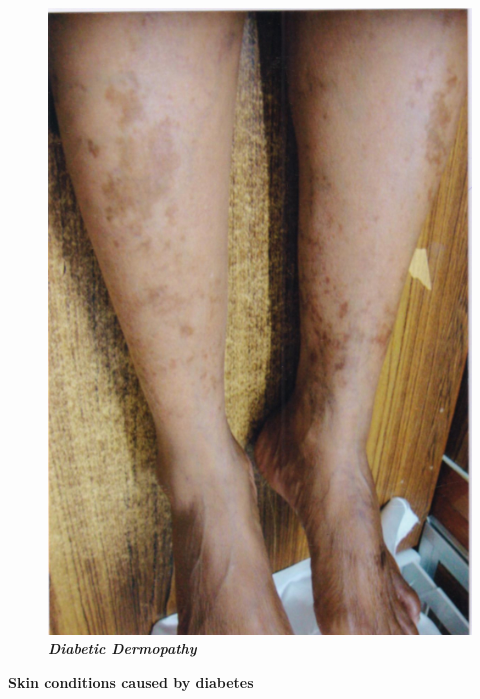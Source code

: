 \begin{figure}[h]
\centering
\includegraphics[scale=1.1]{images/072.jpg}\\
\textbf{\textit{Diabetic Dermopathy}}
\end{figure}

\textbf{Skin conditions caused by diabetes}

